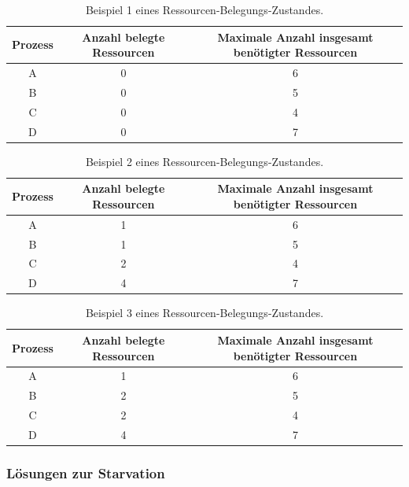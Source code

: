 \begin{description}
\begin{description}
							\begin{table}
								\caption{Beispiel 1 eines Ressourcen-Belegungs-Zustandes.}
								\begin{tabular}{c|c|c}
									Prozess & Anzahl belegte Ressourcen & Maximale Anzahl insgesamt benötigter Ressourcen \\
									\hline
									A & 0 & 6 \\
									B & 0 & 5 \\
									C & 0 & 4 \\
									D & 0 & 7 \\
								\end{tabular}
								\label{tab:BspRessourcenBelegungsZustand1}
							\end{table}
							
							\begin{table}
								\caption{Beispiel 2 eines Ressourcen-Belegungs-Zustandes.}
								\begin{tabular}{c|c|c}
									Prozess & Anzahl belegte Ressourcen & Maximale Anzahl insgesamt benötigter Ressourcen \\
									\hline
									A & 1 & 6 \\
									B & 1 & 5 \\
									C & 2 & 4 \\
									D & 4 & 7 \\
								\end{tabular}
								\label{tab:BspRessourcenBelegungsZustand2}
							\end{table}
							
							\begin{table}
								\caption{Beispiel 3 eines Ressourcen-Belegungs-Zustandes.}
								\begin{tabular}{c|c|c}
									Prozess & Anzahl belegte Ressourcen & Maximale Anzahl insgesamt benötigter Ressourcen \\
									\hline
									A & 1 & 6 \\
									B & 2 & 5 \\
									C & 2 & 4 \\
									D & 4 & 7 \\
								\end{tabular}
								\label{tab:BspRessourcenBelegungsZustand3}
							\end{table}
						\end{description}
				\end{description}
			\subsubsection{Lösungen zur Starvation}
			
